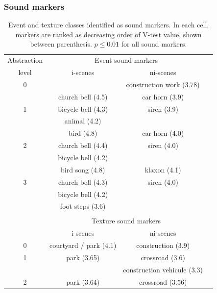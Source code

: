 \documentclass[12pt]{elsarticle}
\begin{document}
\subsubsection*{Sound markers}

\begin{table}[t]
 \setlength{\tabcolsep}{0.2pt}
 \centering
  {\renewcommand{\arraystretch}{0.9}
\begin{tabular}{c c c c}
Abstraction        & \multicolumn{2}{c}{Event sound markers} \\
level & i-scenes & ni-scenes \\
\hline
0  &                          & construction work (3.78)  \\
\hline
  & church bell  (4.5)             & car horn  (3.9) \\
1 & bicycle bell  (4.3)      & siren (3.9)\\
  & animal (4.2)              &       \\
   \hline
  & bird        (4.8)       & car horn  (4.0)\\
2 & church bell  (4.4)             & siren (4.0)\\
  & bicycle bell     (4.2)             &       \\
   \hline
  & bird song (4.8)        & klaxon  (4.1)\\
3 & church bell   (4.3)            & siren (4.0)\\
  & bicycle bell      (4.2)   &       \\
  & foot steps  (3.6)      &  \\
  &                           & \\
  & \multicolumn{2}{c}{Texture sound markers}      \\
  & i-scenes & ni-scenes \\
\hline
0 &     courtyard / park (4.1) &  construction (3.9)  \\
\hline
1 &     park (3.65)          &  crossroad (3.6)  \\
  &                          &  construction vehicule (3.3)  \\
\hline
2 &     park (3.64)          &  crossroad (3.56)  \\
\hline
\end{tabular}
}
\vspace{0.5mm}
\caption{Event and texture classes identified as sound markers. In each cell, markers are ranked as decreasing order of V-test value, shown between parenthesis. $p\leq0.01$ for all sound markers.}
\label{tab:markers}
\end{table}
\end{document}
